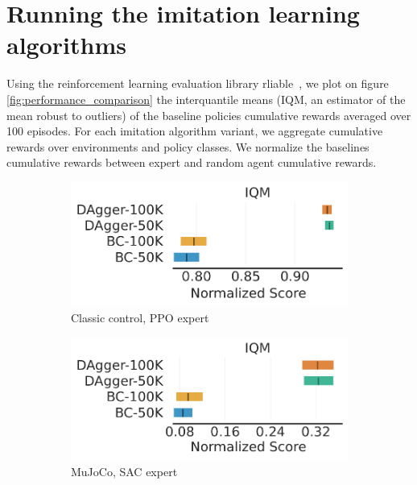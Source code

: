 \section{Running the imitation learning algorithms}
Using the reinforcement learning evaluation library rliable~\cite{rliable}, we plot on figure \ref{fig:performance_comparison} the interquantile means (IQM, an estimator of the mean robust to outliers) of the baseline policies cumulative rewards averaged over 100 episodes.
For each imitation algorithm variant, we aggregate cumulative rewards over environments and policy classes.
We normalize the baselines cumulative rewards between expert and random agent cumulative rewards.

\begin{figure}[ht]
\centering
\begin{subfigure}{.33\textwidth}
  \centering
  \includegraphics[width=\linewidth]{images/images_part3/ppo_expert_classic_control.pdf}
  \caption{Classic control, PPO expert}
  \label{fig:ppo_classic}
\end{subfigure}%
\begin{subfigure}{.33\textwidth}
  \centering
  \includegraphics[width=\linewidth]{images/images_part3/sac_expert_mujoco.pdf}
  \caption{MuJoCo, SAC expert}
  \label{fig:sac_mujoco}
\end{subfigure}
\begin{subfigure}{.33\textwidth}

\end{subfigure}
\end{figure}
